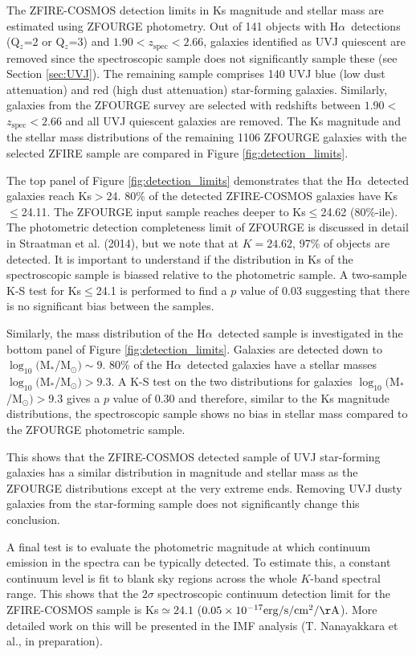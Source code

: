 \documentclass[iop]{emulateapj}
\newcommand{\Halpha}{H$\alpha$}
\newcommand{\zspec}{$z_{\mathrm{spec}}$}
\newcommand{\mass}{M$_*$/M$_\odot$}
\begin{document}
The ZFIRE-COSMOS detection limits in Ks magnitude and stellar mass are estimated using ZFOURGE photometry. 
Out of 141 objects with \Halpha\ detections (Q$_{z}$=2 or Q$_{z}$=3) and $1.90<$\zspec$<2.66$, galaxies identified as UVJ quiescent are removed since the spectroscopic sample does not significantly sample these (see Section \ref{sec:UVJ}). The remaining sample comprises 140 UVJ blue (low dust attenuation) and red (high dust attenuation) star-forming galaxies. 
Similarly, galaxies from the ZFOURGE survey are selected with redshifts between $1.90<$\zspec$<2.66$ and all UVJ quiescent galaxies are removed. The Ks magnitude and the stellar mass distributions of the remaining 1106 ZFOURGE galaxies with the selected ZFIRE sample are compared in Figure \ref{fig:detection_limits}.  

The top panel of Figure \ref{fig:detection_limits} demonstrates that the \Halpha\ detected galaxies reach Ks$>$24. 
80\% of the detected ZFIRE-COSMOS galaxies have Ks$\leq$24.11. The ZFOURGE input sample reaches deeper to 
Ks$\leq$24.62 (80\%-ile). The photometric detection completeness limit of ZFOURGE is discussed in detail in Straatman
et al. (2014), but we note that at $K=24.62$, 97\% of objects are detected. It is important to understand if the distribution in Ks of the spectroscopic sample is biassed relative to the photometric sample. A two-sample K-S test for Ks$\leq$24.1 is performed to find a $p$ value of 0.03 suggesting that there is no significant bias between the samples. 

Similarly, the mass distribution of the \Halpha\ detected sample is investigated in the bottom panel of Figure  \ref{fig:detection_limits}. Galaxies are detected down to $\log_{10}($\mass$)\sim9$.
80\% of the \Halpha\ detected galaxies have a stellar masses $\log_{10}($\mass$)>9.3$. A K-S test on the two distributions for galaxies $\log_{10}($\mass$)>9.3$ gives a $p$ value of 0.30 and therefore, similar to the Ks magnitude distributions, the spectroscopic sample shows no bias in stellar mass compared to the ZFOURGE photometric sample. 

This shows that the ZFIRE-COSMOS detected sample of UVJ star-forming galaxies has a similar distribution in magnitude and stellar mass as the ZFOURGE distributions except at the very extreme ends. 
Removing UVJ dusty galaxies from the star-forming sample does not significantly change this conclusion. 

A final test is to evaluate the photometric magnitude at which continuum emission in the spectra can be typically detected. To estimate this, a constant continuum level is fit to blank sky regions across the whole $K$-band spectral range. This shows that  the $2\sigma$ spectroscopic continuum detection limit for the ZFIRE-COSMOS sample is Ks$\simeq 24.1$ ($0.05 \times 10^{-17} \mathrm{erg/s/cm^2/\AA}$). More detailed work on this will be presented in the IMF analysis (T. Nanayakkara et al., in preparation).  
\end{document}
